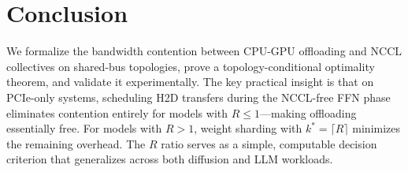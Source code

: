 \documentclass{article}
\begin{document}
\section{Conclusion}
\label{sec:conclusion}

We formalize the bandwidth contention between CPU-GPU offloading and NCCL collectives on shared-bus topologies, prove a topology-conditional optimality theorem, and validate it experimentally. The key practical insight is that on PCIe-only systems, scheduling H2D transfers during the NCCL-free FFN phase eliminates contention entirely for models with $R \leq 1$---making offloading essentially free. For models with $R > 1$, weight sharding with $k^* = \lceil R \rceil$ minimizes the remaining overhead. The $R$ ratio serves as a simple, computable decision criterion that generalizes across both diffusion and LLM workloads.


\end{document}
